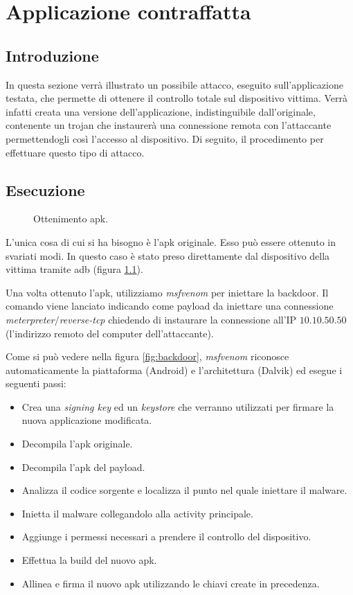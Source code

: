 \chapter{Applicazione contraffatta}

\section{Introduzione}

In questa sezione verrà illustrato un possibile attacco, eseguito sull'applicazione testata, che permette di ottenere il controllo totale sul dispositivo vittima. Verrà infatti creata una versione dell'applicazione, indistinguibile dall'originale, contenente un trojan che instaurerà una connessione remota con l'attaccante permettendogli così l'accesso al dispositivo. Di seguito, il procedimento per effettuare questo tipo di attacco.

\section{Esecuzione}

\begin{figure}[h]
	\centering
	\caption{Ottenimento apk.}
	\label{fig:apk}
\end{figure}

L'unica cosa di cui si ha bisogno è l'apk originale. Esso può essere ottenuto in svariati modi. In questo caso è stato preso direttamente dal dispositivo della vittima tramite adb (figura \ref{fig:apk}).

Una volta ottenuto l'apk, utilizziamo \emph{msfvenom}\cite{MSFVenom} per iniettare la backdoor. Il comando viene lanciato indicando come payload da iniettare una connessione \emph{meterpreter}$/$\emph{reverse-tcp} chiedendo di instaurare la connessione all'IP $10.10.50.50$ (l'indirizzo remoto del computer dell'attaccante).

Come si può vedere nella figura \ref{fig:backdoor}, \emph{msfvenom} riconosce automaticamente la piattaforma (Android) e l'architettura (Dalvik) ed esegue i seguenti passi:

\begin{itemize}
	\item Crea una \emph{signing key} ed un \emph{keystore} che verranno utilizzati per firmare la nuova applicazione modificata.
	\item Decompila l'apk originale.
	\item Decompila l'apk del payload.
	\item Analizza il codice sorgente e localizza il punto nel quale iniettare il malware.
	\item Inietta il malware collegandolo alla activity principale.
	\item Aggiunge i permessi necessari a prendere il controllo del dispositivo.
	\item Effettua la build del nuovo apk.
	\item Allinea e firma il nuovo apk utilizzando le chiavi create in precedenza.
\end{itemize}

